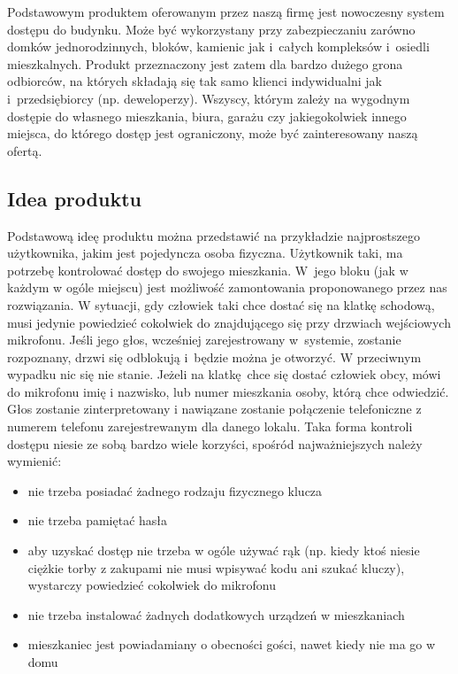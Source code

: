 \documentclass[../main.tex]{subfiles}
\begin{document}
 {

    Podstawowym produktem oferowanym przez naszą firmę jest nowoczesny system dostępu
    do budynku. Może być wykorzystany przy zabezpieczaniu zarówno domków
    jednorodzinnych, bloków, kamienic jak i~całych kompleksów i~osiedli mieszkalnych.
    Produkt przeznaczony jest zatem dla bardzo dużego grona odbiorców, na których
    składają się tak samo klienci indywidualni jak i~przedsiębiorcy (np. deweloperzy).
    Wszyscy, którym zależy na wygodnym dostępie do własnego mieszkania, biura, garażu
    czy jakiegokolwiek innego miejsca, do którego dostęp jest ograniczony, może być
    zainteresowany naszą ofertą.

    \subsection{Idea produktu}
    \label{chapter1:opis_produktu:idea_produktu} {
        Podstawową ideę produktu można przedstawić na przykładzie najprostszego
        użytkownika, jakim jest pojedyncza osoba fizyczna. Użytkownik taki, ma potrzebę
        kontrolować dostęp do swojego mieszkania. W~jego bloku (jak w każdym w ogóle
        miejscu) jest możliwość zamontowania proponowanego przez nas rozwiązania. W
        sytuacji, gdy człowiek taki chce dostać się na klatkę schodową, musi jedynie
        powiedzieć cokolwiek do znajdującego się przy drzwiach wejściowych mikrofonu.
        Jeśli jego głos, wcześniej zarejestrowany w~systemie, zostanie rozpoznany,
        drzwi się odblokują i~będzie można je otworzyć. W przeciwnym wypadku nic się
        nie stanie. Jeżeli na klatkę chce się dostać człowiek obcy, mówi do mikrofonu
        imię i nazwisko, lub numer mieszkania osoby, którą chce odwiedzić. Głos zostanie 
        zinterpretowany i nawiązane zostanie połączenie telefoniczne z numerem telefonu
        zarejestrewanym dla danego lokalu. Taka forma kontroli dostępu niesie ze sobą 
        bardzo wiele korzyści, spośród najważniejszych należy wymienić:
        \begin{itemize}
            \item nie trzeba posiadać żadnego rodzaju fizycznego klucza
            \item nie trzeba pamiętać hasła
            \item aby uzyskać dostęp nie trzeba w ogóle używać rąk (np. kiedy ktoś
            niesie ciężkie torby z zakupami nie musi wpisywać kodu ani szukać kluczy),
            wystarczy powiedzieć cokolwiek do mikrofonu
            \item nie trzeba instalować żadnych dodatkowych urządzeń w mieszkaniach
            \item mieszkaniec jest powiadamiany o obecności gości, nawet kiedy
                nie ma go w domu
        \end{itemize}
    }

}
\end{document}
